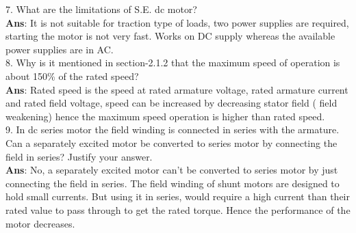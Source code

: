 \documentclass[12pt]{article}
\begin{document}
    7. What are the limitations of S.E. dc motor?\vspace{0.1cm} \\
    \textbf{Ans}: It is not suitable for traction type of loads, two power supplies are required, starting the motor is not very fast. Works on DC supply whereas the available power supplies are in AC. 
    \vspace{0.2cm}\\
    8. Why is it mentioned in section-2.1.2 that the maximum speed of operation is about 150\% of the rated speed?\vspace{0.1cm} \\
    \textbf{Ans}: Rated speed is the speed at rated armature voltage, rated armature current and rated field voltage, speed can be increased by decreasing stator field ( field weakening) hence the maximum speed operation is higher than rated speed.  
    \vspace{0.2cm}\\
    9. In dc series motor the field winding is connected in series with the armature. Can a separately excited motor be converted to series motor by connecting the field in series? Justify your answer.\vspace{0.1cm} \\
    \textbf{Ans}: No, a separately excited motor can't be converted to series motor by just connecting the field in series. 
    The field winding of shunt motors are designed to hold small currents. But using it in series, would require a high current than their rated value to pass through to get the rated torque. Hence the performance of the motor decreases.
    \vspace{0.2cm}
            
  
\end{document}
